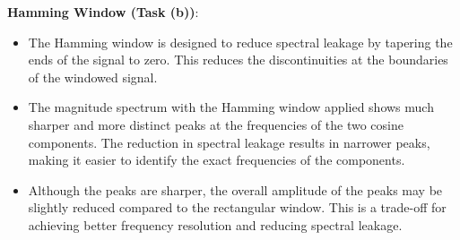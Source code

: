 \textbf{Hamming Window (Task (b))}:
\begin{itemize}
    \item The Hamming window is designed to reduce spectral leakage by tapering the ends of the signal to zero. This reduces the discontinuities at the boundaries of the windowed signal.
    \item The magnitude spectrum with the Hamming window applied shows much sharper and more distinct peaks at the frequencies of the two cosine components. The reduction in spectral leakage results in narrower peaks, making it easier to identify the exact frequencies of the components.
    \item Although the peaks are sharper, the overall amplitude of the peaks may be slightly reduced compared to the rectangular window. This is a trade-off for achieving better frequency resolution and reducing spectral leakage.
\end{itemize}

